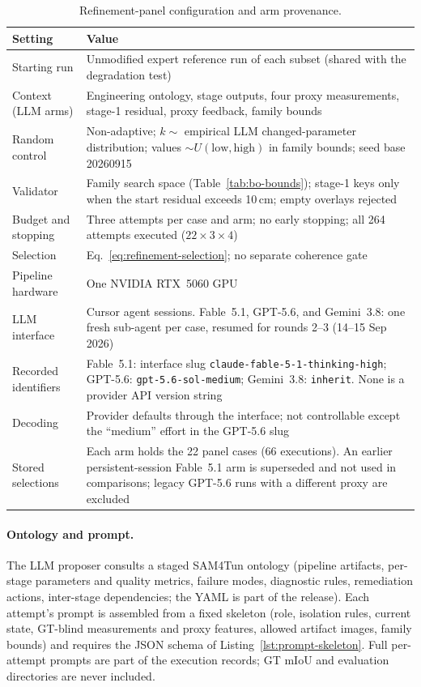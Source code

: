 \documentclass[a4paper,fleqn]{cas-dc}
\begin{document}
\begin{table}[t]
\caption{Refinement-panel configuration and arm provenance.}
\label{tab:poc-config}
\centering
\small
\begin{tabular*}{\textwidth}{@{\extracolsep{\fill}} Y{0.20\textwidth} Y{0.74\textwidth}}
\toprule
Setting & Value \\
\midrule
Starting run & Unmodified expert reference run of each subset (shared with the degradation test) \\
Context (LLM arms) & Engineering ontology, stage outputs, four proxy measurements, stage-1 residual, proxy feedback, family bounds \\
Random control & Non-adaptive; $k\sim$ empirical LLM changed-parameter distribution; values $\sim U(\mathrm{low},\mathrm{high})$ in family bounds; seed base 20260915 \\
Validator & Family search space (Table~\ref{tab:bo-bounds}); stage-1 keys only when the start residual exceeds 10\,cm; empty overlays rejected \\
Budget and stopping & Three attempts per case and arm; no early stopping; all 264 attempts executed ($22\times3\times4$) \\
Selection & Eq.~\eqref{eq:refinement-selection}; no separate coherence gate \\
Pipeline hardware & One NVIDIA RTX~5060 GPU \\
\midrule
LLM interface & Cursor agent sessions. Fable~5.1, GPT-5.6, and Gemini~3.8: one fresh sub-agent per case, resumed for rounds 2--3 (14--15 Sep 2026) \\
Recorded identifiers & Fable~5.1: interface slug \texttt{claude-fable-5-1-thinking-high}; GPT-5.6: \texttt{gpt-5.6-sol-medium}; Gemini~3.8: \texttt{inherit}. None is a provider API version string \\
Decoding & Provider defaults through the interface; not controllable except the ``medium'' effort in the GPT-5.6 slug \\
Stored selections & Each arm holds the 22 panel cases (66 executions). An earlier persistent-session Fable~5.1 arm is superseded and not used in comparisons; legacy GPT-5.6 runs with a different proxy are excluded \\
\bottomrule
\end{tabular*}
\end{table}

\paragraph{Ontology and prompt.}
The LLM proposer consults a staged SAM4Tun ontology (pipeline artifacts, per-stage parameters and quality metrics, failure modes, diagnostic rules, remediation actions, inter-stage dependencies; the YAML is part of the release). Each attempt's prompt is assembled from a fixed skeleton (role, isolation rules, current state, GT-blind measurements and proxy features, allowed artifact images, family bounds) and requires the JSON schema of Listing~\ref{lst:prompt-skeleton}. Full per-attempt prompts are part of the execution records; GT mIoU and evaluation directories are never included.
\end{document}
